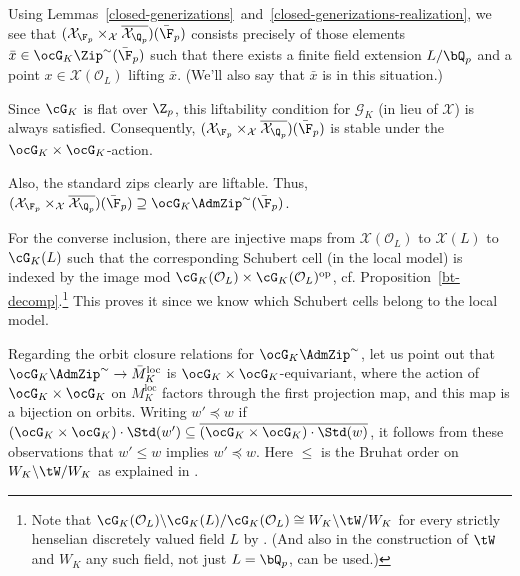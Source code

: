 \documentclass[a4paper]{scrartcl} %
\numberwithin{equation}{section}
\begin{document}
\begin{Proof}
  Using Lemmas~\ref{closed-generizations}~and~\ref{closed-generizations-realization}, we see that $(\mathcal{X}_{\F_p}\times_{\mathcal{X}}\overline{\mathcal{X}_{\Q_p}})(\bar\F_p)$ consists precisely of those elements $\bar{x}\in\ocG_K\Zip^{\sim}(\bar\F_p)$ such that there exists a finite field extension $L/\bQ_p$ and a point $x\in\mathcal{X}(\mathcal{O}_L)$ lifting $\bar x$. (We'll also say that $\bar x$ is  in this situation.)

  Since $\cG_K$ is flat over $\Z_p$, this liftability condition for $\mathcal{G}_K$ (in lieu of $\mathcal{X}$) is always satisfied. Consequently, $(\mathcal{X}_{\F_p}\times_{\mathcal{X}}\overline{\mathcal{X}_{\Q_p}})(\bar\F_p)$ is stable under the $\ocG_K\times\ocG_K$-action.

  Also, the standard zips clearly are liftable. Thus, $(\mathcal{X}_{\F_p}\times_{\mathcal{X}}\overline{\mathcal{X}_{\Q_p}})(\bar\F_p)\supseteq\ocG_K\AdmZip^{\sim}(\bar\F_p)$.

  For the converse inclusion, there are injective maps from $\mathcal{X}(\mathcal{O}_L)$ to $\mathcal{X}(L)$ to $\cG_K(L)$ such that the corresponding Schubert cell (in the local model) is indexed by the image mod $\cG_K(\mathcal{O}_L)\times \cG_K(\mathcal{O}_L)^\mathrm{op}$, cf. Proposition~\ref{bt-decomp}.\footnote{Note that $\cG_K(\mathcal{O}_L)\backslash \cG_K(L) /\cG_K(\mathcal{O}_L)\cong W_K\backslash\tW/W_K$ for every strictly henselian discretely valued field $L$ by \cite[Prop.~8]{hainesrap}. (And also in the construction of $\tW$ and $W_K$ any such field, not just $L=\bQ_p$, can be used.)} This proves it since we know which Schubert cells belong to the local model.
\end{Proof}




\begin{Remark}
  Regarding the orbit closure relations for $\ocG_K\AdmZip^{\sim}$, let us point out that $\ocG_K\AdmZip^{\sim}\to \bar{M}^\mathrm{loc}_K$ is $\ocG_K\times\ocG_K$-equivariant, where the action of $\ocG_K\times\ocG_K$ on $M^\mathrm{loc}_K$ factors through the first projection map, and this map is a bijection on orbits. Writing $w'\preceq w$ if $(\ocG_K\times\ocG_K)\cdot \Std(w')\subseteq \overline{(\ocG_K\times\ocG_K)\cdot \Std(w)}$, it follows from these observations that $w'\leq w$ implies $w'\preceq w$.  Here $\leq$ is the Bruhat order on $W_K\backslash \tW/W_K$ as explained in \cite[section~4.2]{prs}.
\end{Remark}
\end{document}
